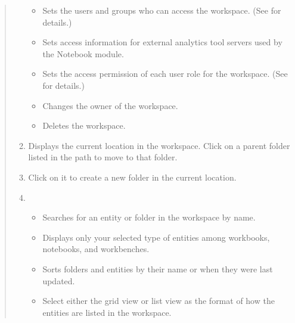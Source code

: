 \documentclass[letterpaper,10pt,english]{sphinxmanual}
\begin{document}
\begin{quote}
\begin{enumerate}
\begin{itemize}
\item {} 
 Sets the users and groups who can access the workspace. (See {\hyperref[\detokenize{discovery/part03/shared_workspace:shared-workspace-permission}]{}} for details.)

\item {} 
 Sets access information for external analytics tool servers used by the Notebook module.

\item {} 
 Sets the access permission of each user role for the workspace. (See {\hyperref[\detokenize{discovery/part03/shared_workspace:shared-workspace-permission}]{}} for details.)

\item {} 
 Changes the owner of the workspace.

\item {} 
 Deletes the workspace.

\end{itemize}

\item {} 
 Displays the current location in the workspace. Click on a parent folder listed in the path to move to that folder.

\item {} 
 Click on it to create a new folder in the current location.

\item {} 
\begin{itemize}
\item {} 
 Searches for an entity or folder in the workspace by name.

\item {} 
 Displays only your selected type of entities among workbooks, notebooks, and workbenches.

\item {} 
 Sorts folders and entities by their name or when they were last updated.

\item {} 
 Select either the grid view or list view as the format of how the entities are listed in the workspace.


\end{itemize}
\end{enumerate}
\end{quote}
\end{document}
